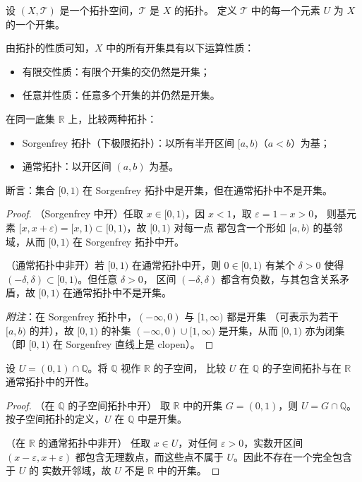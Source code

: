 \begin{definition}[拓扑空间中的开集]
设 $(X,\mathcal{T})$ 是一个拓扑空间，$\mathcal{T}$ 是 $X$ 的拓扑。  
定义 $\mathcal{T}$ 中的每一个元素 $U$ 为 $X$ 的一个开集。  

由拓扑的性质可知，$X$ 中的所有开集具有以下运算性质：  
\begin{itemize}
  \item 有限交性质：有限个开集的交仍然是开集；
  \item 任意并性质：任意多个开集的并仍然是开集。
\end{itemize}
\end{definition}
\begin{example}
在同一底集 $\mathbb{R}$ 上，比较两种拓扑：
\begin{itemize}
  \item Sorgenfrey 拓扑（下极限拓扑）：以所有半开区间 $[a,b)$（$a<b$）为基；
  \item 通常拓扑：以开区间 $(a,b)$ 为基。
\end{itemize}
断言：集合 $[0,1)$ 在 Sorgenfrey 拓扑中是开集，但在通常拓扑中不是开集。
\end{example}

\begin{proof}
（Sorgenfrey 中开）任取 $x\in[0,1)$，因 $x<1$，取 $\varepsilon=1-x>0$，
则基元素 $[x,x+\varepsilon)=[x,1)\subset[0,1)$，故 $[0,1)$ 对每一点
都包含一个形如 $[a,b)$ 的基邻域，从而 $[0,1)$ 在 Sorgenfrey 拓扑中开。

（通常拓扑中非开）若 $[0,1)$ 在通常拓扑中开，则 $0\in[0,1)$ 有某个
$\delta>0$ 使得 $(-\delta,\delta)\subset[0,1)$。但任意 $\delta>0$，
区间 $(-\delta,\delta)$ 都含有负数，与其包含关系矛盾，故 $[0,1)$
在通常拓扑中不是开集。

\emph{附注}：在 Sorgenfrey 拓扑中，$(-\infty,0)$ 与 $[1,\infty)$ 都是开集
（可表示为若干 $[a,b)$ 的并），故 $[0,1)$ 的补集 $(-\infty,0)\cup[1,\infty)$
是开集，从而 $[0,1)$ 亦为闭集（即 $[0,1)$ 在 Sorgenfrey 直线上是 clopen）。
\end{proof}

\begin{example}
设 $U=(0,1)\cap\mathbb{Q}$。将 $\mathbb{Q}$ 视作 $\mathbb{R}$ 的子空间，
比较 $U$ 在 $\mathbb{Q}$ 的子空间拓扑与在 $\mathbb{R}$ 通常拓扑中的开性。
\end{example}

\begin{proof}
（在 $\mathbb{Q}$ 的子空间拓扑中开）
取 $\mathbb{R}$ 中的开集 $G=(0,1)$，则 $U=G\cap\mathbb{Q}$。
按子空间拓扑的定义，$U$ 在 $\mathbb{Q}$ 中是开集。

（在 $\mathbb{R}$ 的通常拓扑中非开）
任取 $x\in U$，对任何 $\varepsilon>0$，实数开区间 $(x-\varepsilon,x+\varepsilon)$
都包含无理数点，而这些点不属于 $U$。因此不存在一个完全包含于 $U$ 的
实数开邻域，故 $U$ 不是 $\mathbb{R}$ 中的开集。
\end{proof}
